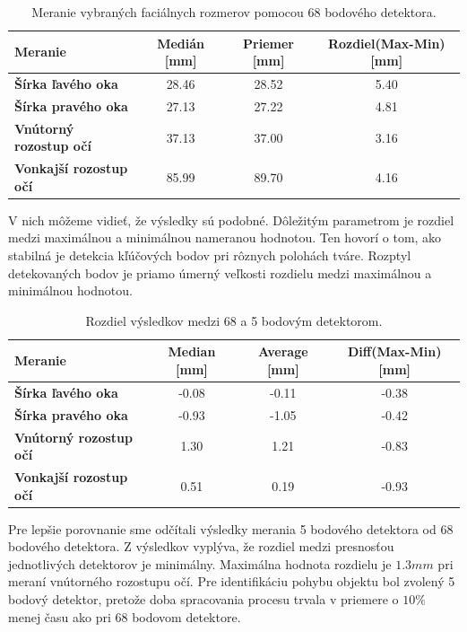 \begin{table}[h]
	\caption{\label{tab:dlib:68points} Meranie vybraných faciálnych rozmerov pomocou 68 bodového detektora.}
	\centering
	\begin{tabular}{lccc}
		\toprule
		\textbf{Meranie} & \textbf{Medián [mm]} & \textbf{Priemer [mm]} & \textbf{Rozdiel(Max-Min) [mm]} \\ 
		\midrule
		\textbf{Šírka ľavého oka} 	& 28.46 & 28.52	& 5.40 \\
		\textbf{Šírka pravého oka} 	& 27.13	& 27.22 & 4.81 \\
		\textbf{Vnútorný rozostup očí} 	& 37.13	& 37.00 & 3.16 \\
		\textbf{Vonkajší rozostup očí} 	& 85.99	& 89.70 & 4.16 \\
		\bottomrule
	\end{tabular}
\end{table}

V nich môžeme vidieť, že výsledky sú podobné. Dôležitým parametrom je rozdiel medzi maximálnou a minimálnou nameranou hodnotou. Ten hovorí o tom, ako stabilná je detekcia kľúčových bodov pri rôznych polohách tváre. Rozptyl detekovaných bodov je priamo úmerný veľkosti rozdielu medzi maximálnou a minimálnou hodnotou.

\begin{table}[H]
	\caption{\label{tab:dlib:resulrs} Rozdiel výsledkov medzi 68 a 5 bodovým detektorom.}
	\centering
	\begin{tabular}{lccc}
		\toprule
		\textbf{Meranie} & \textbf{Median [mm]} & \textbf{Average [mm]} & \textbf{Diff(Max-Min) [mm]} \\ 
		\midrule
		\textbf{Šírka ľavého oka} 	& -0.08 & -0.11	& -0.38 \\
		\textbf{Šírka pravého oka} 	& -0.93	& -1.05 & -0.42 \\
		\textbf{Vnútorný rozostup očí} 	& 1.30	& 1.21 & -0.83 \\
		\textbf{Vonkajší rozostup očí} 	& 0.51	& 0.19 & -0.93 \\
		\bottomrule
	\end{tabular}
\end{table}

Pre lepšie porovnanie sme odčítali výsledky merania 5 bodového detektora od 68 bodového detektora. Z výsledkov vyplýva, že rozdiel medzi presnosťou jednotlivých detektorov je minimálny. Maximálna hodnota rozdielu je $1.3mm$ pri meraní vnútorného rozostupu očí.
Pre identifikáciu pohybu objektu bol zvolený 5 bodový detektor, pretože doba spracovania procesu trvala v priemere o $ 10\% $ menej času ako pri 68 bodovom detektore.  

